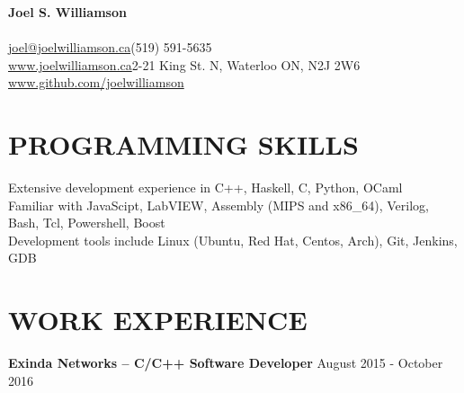 \documentclass{res}
\begin{document}
 

\begin{center}
{\Large\bf Joel S. Williamson}
\end{center}
\vspace{-5mm}
\paragraph{}
       \href{mailto:joel@joelwilliamson.ca}{joel@joelwilliamson.ca}\hfill(519) 591-5635\\
       \url{www.joelwilliamson.ca}\hfill2-21 King St. N, Waterloo ON, N2J 2W6\\
       \url{www.github.com/joelwilliamson}
 
\begin{resume}

  \section{PROGRAMMING SKILLS}
  \vspace{3mm}
  Extensive development experience in C++, Haskell, C, Python, OCaml\\
  Familiar with JavaScipt, LabVIEW, Assembly (MIPS and x86\_64), Verilog, Bash, Tcl, Powershell, Boost\\
  Development tools include Linux (Ubuntu, Red Hat, Centos, Arch), Git, Jenkins, GDB
  \section{WORK EXPERIENCE}
  \vspace{3mm}
         {\bf Exinda Networks -- C/C++ Software Developer} \hfill August 2015 - October 2016\vspace{-3mm}


\end{resume}
\end{document}
